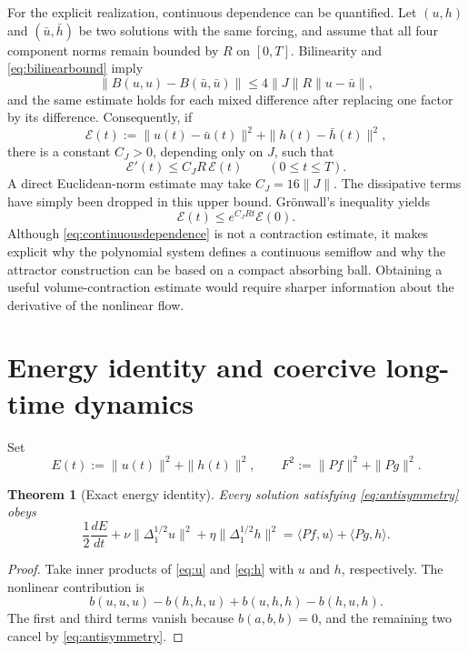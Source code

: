 \documentclass[11pt]{article}
\newtheorem{theorem}{Theorem}
\theoremstyle{remark}
\begin{document}
For the explicit realization, continuous dependence can be quantified. Let $(u,h)$ and $(\bar u,\bar h)$ be two solutions with the same forcing, and assume that all four component norms remain bounded by $R$ on $[0,T]$. Bilinearity and \eqref{eq:bilinearbound} imply
\[
\|B(u,u)-B(\bar u,\bar u)\|
\leq4\|J\|R\|u-\bar u\|,
\]
and the same estimate holds for each mixed difference after replacing one factor by its difference. Consequently, if
\[
\mathcal E(t):=\|u(t)-\bar u(t)\|^2+\|h(t)-\bar h(t)\|^2,
\]
there is a constant $C_J>0$, depending only on $J$, such that
\begin{equation}
\mathcal E'(t)\leq C_JR\,\mathcal E(t)
\qquad(0\leq t\leq T).
\label{eq:continuousdependence}
\end{equation}
A direct Euclidean-norm estimate may take $C_J=16\|J\|$. The dissipative terms have simply been dropped in this upper bound. Gr\"onwall's inequality yields
\[
\mathcal E(t)\leq e^{C_JRt}\mathcal E(0).
\]
Although \eqref{eq:continuousdependence} is not a contraction estimate, it makes explicit why the polynomial system defines a continuous semiflow and why the attractor construction can be based on a compact absorbing ball. Obtaining a useful volume-contraction estimate would require sharper information about the derivative of the nonlinear flow.

\section{Energy identity and coercive long-time dynamics}

Set
\[
E(t):=\|u(t)\|^2+\|h(t)\|^2,
\qquad
F^2:=\|Pf\|^2+\|Pg\|^2.
\]

\begin{theorem}[Exact energy identity]\label{thm:energy}
Every solution satisfying \eqref{eq:antisymmetry} obeys
\begin{equation}
\frac12\frac{dE}{dt}
+\nu\|\Delta_1^{1/2}u\|^2
+\eta\|\Delta_1^{1/2}h\|^2
=\langle Pf,u\rangle+\langle Pg,h\rangle.
\label{eq:energyidentity}
\end{equation}
\end{theorem}

\begin{proof}
Take inner products of \eqref{eq:u} and \eqref{eq:h} with $u$ and $h$, respectively. The nonlinear contribution is
\[
b(u,u,u)-b(h,h,u)+b(u,h,h)-b(h,u,h).
\]
The first and third terms vanish because $b(a,b,b)=0$, and the remaining two cancel by \eqref{eq:antisymmetry}.
\end{proof}
\end{document}

